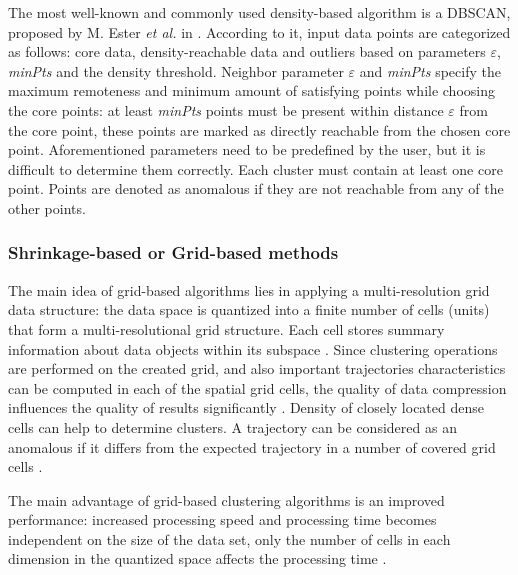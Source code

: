 The most well-known and commonly used density-based algorithm is a DBSCAN, proposed by M. Ester \textit{et al.} in \cite{inproceedings:20_dbscan}. According to it, input data points are categorized as follows: core data, density-reachable data and outliers based on parameters $\varepsilon$, \textit{minPts} and the density threshold. Neighbor parameter $\varepsilon$ and \textit{minPts} specify the maximum remoteness and minimum amount of satisfying points while choosing the core points: at least \textit{minPts} points must be present within distance $\varepsilon$ from the core point, these points are marked as directly reachable from the chosen core point. Aforementioned parameters need to be predefined by the user, but it is difficult to determine them correctly. Each cluster must contain at least one core point. Points are denoted as anomalous if they are not reachable from any of the other points.

\subsubsection{Shrinkage-based or Grid-based methods}
The main idea of grid-based algorithms lies in applying a multi-resolution grid data structure: the data space is quantized into a finite number of cells (units) that form a multi-resolutional grid structure. Each cell stores summary information about data objects within its subspace \cite{article:22_survey_dscc}. Since clustering operations are performed on the created grid, and also important trajectories characteristics can be computed in each of the spatial grid cells, the quality of data compression influences the quality of results significantly \cite{article:1_survey_stdm}. Density of closely located dense cells can help to determine clusters. A trajectory can be considered as an anomalous if it differs from the expected trajectory in a number of covered grid cells \cite{article:22_survey_dscc}.

The main advantage of grid-based clustering algorithms is an improved performance: increased processing speed and processing time becomes independent on the size of the data set, only the number of cells in each dimension in the quantized space affects the processing time \cite{article:8_review_mot_cl_alg}.

